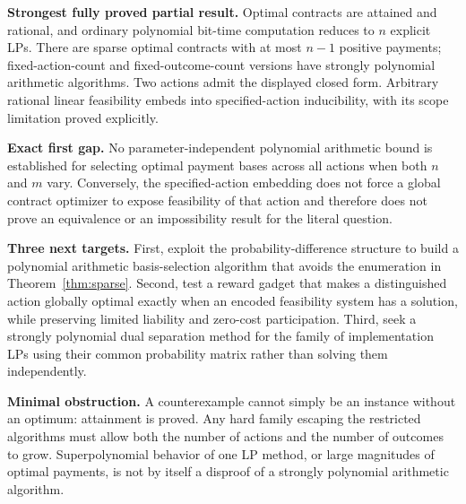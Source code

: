 \documentclass[11pt,a4paper]{article}
\theoremstyle{definition}\newtheorem{definition}[theorem]{Definition}
\theoremstyle{remark}\newtheorem{remark}[theorem]{Remark}
\newcommand{\1}{\mathbf 1}
\begin{document}
\textbf{Strongest fully proved partial result.} Optimal contracts are attained and rational, and ordinary polynomial bit-time computation reduces to $n$ explicit LPs. There are sparse optimal contracts with at most $n-1$ positive payments; fixed-action-count and fixed-outcome-count versions have strongly polynomial arithmetic algorithms. Two actions admit the displayed closed form. Arbitrary rational linear feasibility embeds into specified-action inducibility, with its scope limitation proved explicitly.

\textbf{Exact first gap.} No parameter-independent polynomial arithmetic bound is established for selecting optimal payment bases across all actions when both $n$ and $m$ vary. Conversely, the specified-action embedding does not force a global contract optimizer to expose feasibility of that action and therefore does not prove an equivalence or an impossibility result for the literal question.

\textbf{Three next targets.} First, exploit the probability-difference structure to build a polynomial arithmetic basis-selection algorithm that avoids the enumeration in Theorem~\ref{thm:sparse}. Second, test a reward gadget that makes a distinguished action globally optimal exactly when an encoded feasibility system has a solution, while preserving limited liability and zero-cost participation. Third, seek a strongly polynomial dual separation method for the family of implementation LPs using their common probability matrix rather than solving them independently.

\textbf{Minimal obstruction.} A counterexample cannot simply be an instance without an optimum: attainment is proved. Any hard family escaping the restricted algorithms must allow both the number of actions and the number of outcomes to grow. Superpolynomial behavior of one LP method, or large magnitudes of optimal payments, is not by itself a disproof of a strongly polynomial arithmetic algorithm.
\end{document}
